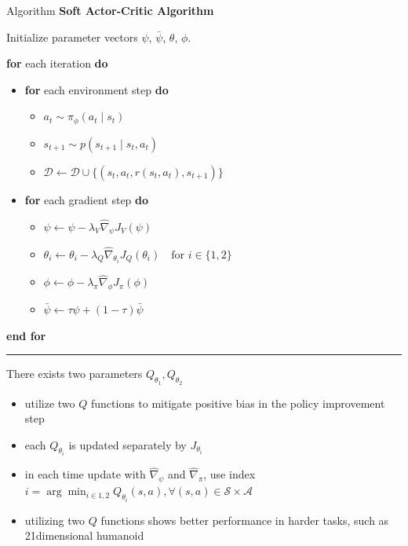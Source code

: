 \documentclass[8pt]{beamer}
\begin{document}
\begin{frame}{Algorithm}
    \textbf{Soft Actor-Critic Algorithm}

    Initialize parameter vectors $\psi$, $\bar{\psi}$, $\theta$, $\phi$.
    \medskip

    \textbf{for} each iteration \textbf{do}
    \begin{itemize}
        \item \textbf{for} each environment step \textbf{do}
        \begin{itemize}
            \item $a_t \sim \pi_\phi(a_t \mid s_t)$
            \item $s_{t+1} \sim p(s_{t+1} \mid s_t, a_t)$
            \item $\mathcal{D} \leftarrow \mathcal{D} \cup \{(s_t, a_t, r(s_t, a_t), s_{t+1})\}$
        \end{itemize}
        \item \textbf{for} each gradient step \textbf{do}
        \begin{itemize}
            \item $\psi \leftarrow \psi - \lambda_V \hat{\nabla}_\psi J_V(\psi)$
            \item $\theta_i \leftarrow \theta_i - \lambda_Q \hat{\nabla}_{\theta_i} J_Q(\theta_i) \quad \text{for } i \in \{1, 2\}$
            \item $\phi \leftarrow \phi - \lambda_\pi \hat{\nabla}_\phi J_\pi(\phi)$
            \item $\bar{\psi} \leftarrow \tau \psi + (1 - \tau) \bar{\psi}$
        \end{itemize}
    \end{itemize}
    \textbf{end for}
    \medskip
    \hrule

\medskip
There exists two parameters $Q_{\theta_1}, Q_{\theta_2}$
\begin{itemize}
    \item utilize two $Q$ functions to mitigate positive bias in the policy improvement step
    \item each $Q_{\theta_i}$ is updated separately by $J_{\theta_i}$
    \item in each time update with $\hat{\nabla}_{\psi}$ and $\hat{\nabla}_{\pi}$, use index $i = \arg \min_{i \in 1,2} Q_{\theta_i}(s, a), \forall (s,a) \in \mathcal{S} \times \mathcal{A}$
    \item utilizing two $Q$ functions shows better performance in harder tasks, such as 21dimensional humanoid
\end{itemize}
\end{frame}
\end{document}
